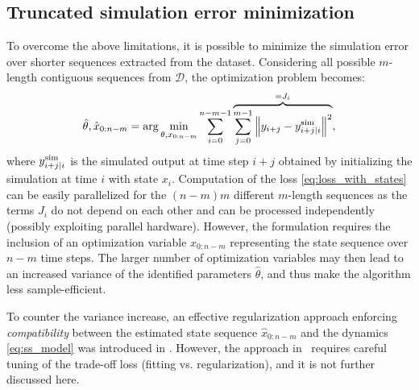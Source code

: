 \documentclass{article}
\newcommand{\D}{\mathcal{D}} %
\newcommand{\nsamp}{n}
\newcommand{\seqlen}{m}
\newcommand{\norm}[1]{\left\lVert#1\right\rVert}
\newcommand{\simul}[1]{{#1}^{\rm sim}}
\begin{document}
\subsection{Truncated simulation error minimization}
To overcome the above limitations, it is possible to minimize the simulation error over shorter sequences extracted from the dataset.
Considering all possible $\seqlen$-length contiguous sequences from $\D$, the optimization problem becomes:
\begin{equation}
\label{eq:loss_with_states}
 \hat \theta,  \hat x_{0:\nsamp-\seqlen} = \arg \min_{\theta, x_{0:\nsamp-\seqlen}} 
 \sum_{i=0}^{\nsamp - \seqlen - 1} 
 \overbrace{\sum_{j=0}^{\seqlen-1} \norm{y_{i+j} - \simul{y}_{i+j|i}}^2}^{=J_i},
\end{equation}
where $\simul{y}_{i+j|i}$ is the simulated output at time step $i+j$ obtained by initializing the simulation 
at time $i$ with state $x_{i}$. Computation of the loss \eqref{eq:loss_with_states} can be easily parallelized for the $(\nsamp - \seqlen)\seqlen$ different $\seqlen$-length sequences as the terms $J_i$ do not depend on each other and can be processed independently (possibly exploiting parallel hardware).
However, the formulation requires the inclusion of an optimization 
variable $x_{0:\nsamp-\seqlen}$ representing the state sequence over $\nsamp-\seqlen$ time steps.
The larger number of optimization variables may then lead to an increased variance of the identified parameters $\hat \theta$, and thus make the algorithm less sample-efficient. 

To counter the variance increase, an effective regularization approach enforcing
\emph{compatibility} between the estimated state sequence $\hat x_{0:\nsamp-\seqlen}$ and the dynamics \eqref{eq:ss_model} was introduced in \cite{forgione2020model}.
However, the approach in~\cite{forgione2020model} requires careful tuning of the trade-off loss (fitting vs. regularization), and it is not further discussed here.
\end{document}
